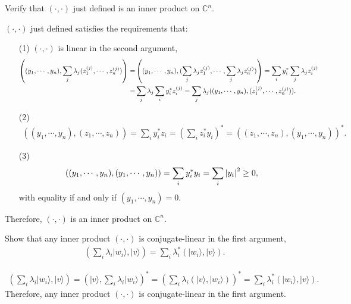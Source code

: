 \documentclass[en]{sol-man}
\begin{document}
\begin{exe}
    Verify that $(\cdot,\cdot)$ just defined is an inner product on $\mathbb{C}^n$.
\end{exe}
\begin{sol}
    $(\cdot,\cdot)$ just defined satisfies the requirements that:
    \begin{itemize}
        \item[(1)] $(\cdot,\cdot)$ is linear in the second argument,
        \begin{align}
            \notag\left((y_1,\cdots,y_n),\sum_j\lambda_j(z_1^{(j)},\cdots,z_n^{(j)})\right)=&\left((y_1,\cdots,y_n),(\sum_j\lambda_jz_1^{(j)},\cdots,\sum_j\lambda_jz_n^{(j)})\right)=\sum_iy_i^*\sum_j\lambda_jz_i^{(j)}\\
            =&\sum_j\lambda_j\sum_iy_i^*z_i^{(j)}=\sum_j\lambda_j((y_1,\cdots,y_n),(z_1^{(j)},\cdots,z_n^{(j)})).
        \end{align}
        \item[(2)] 
        \begin{align}
            ((y_1,\cdots,y_n),(z_1,\cdots,z_n))=\sum_iy_i^*z_i=\left(\sum_iz_i^*y_i\right)^*=((z_1,\cdots,z_n),(y_1,\cdots,y_n))^*.
        \end{align}
        \item[(3)] 
        \begin{align}
            ((y_1,\cdots,y_n),(y_1,\cdots,y_n))=\sum_iy_i^*y_i=\sum_i\left\lvert y_i\right\rvert^2\geq 0,
        \end{align}
        with equality if and only if $(y_1,\cdots,y_n)=0$.
    \end{itemize}
    Therefore, $(\cdot,\cdot)$ is an inner product on $\mathbb{C}^n$.
\end{sol}

\begin{exe}
    Show that any inner product $(\cdot,\cdot)$ is conjugate-linear in the first argument,
    \begin{align}
        \left(\sum_i\lambda_i\lvert w_i\rangle,\lvert v\rangle\right)=\sum_i\lambda_i^*(\lvert w_i\rangle,\lvert v\rangle).
    \end{align}
\end{exe}
\begin{sol}
    \begin{align}
        \left(\sum_i\lambda_i\lvert w_i\rangle,\lvert v\rangle\right)=\left(\lvert v\rangle,\sum_i\lambda_i\lvert w_i\rangle\right)^*=\left(\sum_i\lambda_i(\lvert v\rangle,\lvert w_i\rangle)\right)^*=\sum_i\lambda_i^*(\lvert w_i\rangle,\lvert v\rangle).
    \end{align}
    Therefore, any inner product $(\cdot,\cdot)$ is conjugate-linear in the first argument.
\end{sol}
\end{document}
